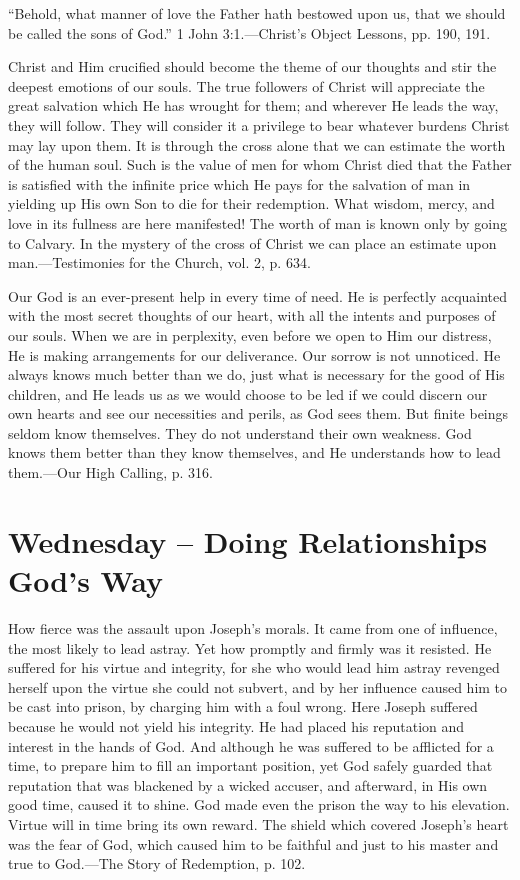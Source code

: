 \documentclass[a4paper, 10pt, twoside, headings=small]{scrartcl}
\begin{document}
\begin{multicols}{2}
“Behold, what manner of love the Father hath bestowed upon us, that we should be called the sons of God.” 1 John 3:1.—Christ’s Object Lessons, pp. 190, 191.

Christ and Him crucified should become the theme of our thoughts and stir the deepest emotions of our souls. The true followers of Christ will appreciate the great salvation which He has wrought for them; and wherever He leads the way, they will follow. They will consider it a privilege to bear whatever burdens Christ may lay upon them. It is through the cross alone that we can estimate the worth of the human soul. Such is the value of men for whom Christ died that the Father is satisfied with the infinite price which He pays for the salvation of man in yielding up His own Son to die for their redemption. What wisdom, mercy, and love in its fullness are here manifested! The worth of man is known only by going to Calvary. In the mystery of the cross of Christ we can place an estimate upon man.—Testimonies for the Church, vol. 2, p. 634.

Our God is an ever-present help in every time of need. He is perfectly acquainted with the most secret thoughts of our heart, with all the intents and purposes of our souls. When we are in perplexity, even before we open to Him our distress, He is making arrangements for our deliverance. Our sorrow is not unnoticed. He always knows much better than we do, just what is necessary for the good of His children, and He leads us as we would choose to be led if we could discern our own hearts and see our necessities and perils, as God sees them. But finite beings seldom know themselves. They do not understand their own weakness. God knows them better than they know themselves, and He understands how to lead them.—Our High Calling, p. 316.

\section*{Wednesday – Doing Relationships God’s Way}

How fierce was the assault upon Joseph’s morals. It came from one of influence, the most likely to lead astray. Yet how promptly and firmly was it resisted. He suffered for his virtue and integrity, for she who would lead him astray revenged herself upon the virtue she could not subvert, and by her influence caused him to be cast into prison, by charging him with a foul wrong. Here Joseph suffered because he would not yield his integrity. He had placed his reputation and interest in the hands of God. And although he was suffered to be afflicted for a time, to prepare him to fill an important position, yet God safely guarded that reputation that was blackened by a wicked accuser, and afterward, in His own good time, caused it to shine. God made even the prison the way to his elevation. Virtue will in time bring its own reward. The shield which covered Joseph’s heart was the fear of God, which caused him to be faithful and just to his master and true to God.—The Story of Redemption, p. 102.


\end{multicols}
\end{document}
